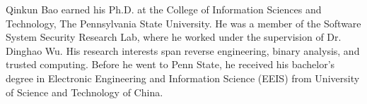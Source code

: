 
Qinkun Bao earned his Ph.D. at the College of Information Sciences
and Technology, The Pennsylvania State University. He was a member of the Software 
System Security Research Lab, where he worked under the supervision of Dr. Dinghao Wu.
His research interests span reverse engineering, binary analysis, and trusted computing. Before he went to Penn State, he received his bachelor's degree in Electronic Engineering and Information Science (EEIS) from University of Science and Technology of China.


 